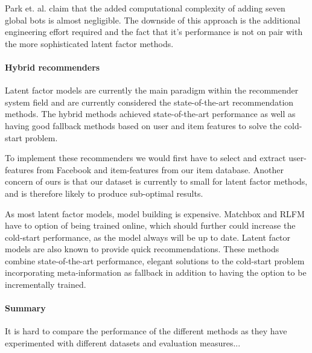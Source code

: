 Park et. al. \cite{Park2006} claim that the added computational complexity of
adding seven global bots is almost negligible. The downside of this approach is
the additional engineering effort required and the fact that it's performance
is not on pair with the more sophisticated latent factor methods.

\paragraph{Hybrid recommenders}


Latent factor models are currently the main paradigm within the recommender
system field and are currently considered the state-of-the-art recommendation
methods. The hybrid methods achieved state-of-the-art performance as well as
having good fallback methods based on user and item features to solve the
cold-start problem.


To implement these recommenders we would first have to select and extract
user-features from Facebook and item-features from our item database. Another
concern of ours is that our dataset is currently to small for latent factor
methods, and is therefore likely to produce sub-optimal results.

As most latent factor models, model building is expensive. Matchbox and RLFM
have to option of being trained online, which should further could increase the
cold-start performance, as the model always will be up to date. Latent factor
models are also known to provide quick recommendations. These methods combine
state-of-the-art performance, elegant solutions to the cold-start problem
incorporating meta-information as fallback in addition to having the option to
be incrementally trained.

\paragraph{Summary}


It is hard to compare the performance of the different methods as they have
experimented with different datasets and evaluation measures...

